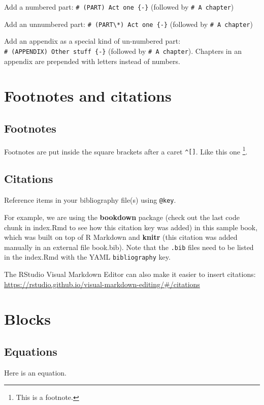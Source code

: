 \documentclass[
  french,
]{book}
\theoremstyle{definition}
\theoremstyle{definition}
\theoremstyle{definition}
\theoremstyle{definition}
\theoremstyle{remark}
\begin{document}
Add a numbered part: \texttt{\#\ (PART)\ Act\ one\ \{-\}} (followed by \texttt{\#\ A\ chapter})

Add an unnumbered part: \texttt{\#\ (PART\textbackslash{}*)\ Act\ one\ \{-\}} (followed by \texttt{\#\ A\ chapter})

Add an appendix as a special kind of un-numbered part: \texttt{\#\ (APPENDIX)\ Other\ stuff\ \{-\}} (followed by \texttt{\#\ A\ chapter}). Chapters in an appendix are prepended with letters instead of numbers.

\chapter{Footnotes and citations}

\section{Footnotes}

Footnotes are put inside the square brackets after a caret \texttt{\^{}{[}{]}}. Like this one \footnote{This is a footnote.}.

\section{Citations}

Reference items in your bibliography file(s) using \texttt{@key}.

For example, we are using the \textbf{bookdown} package \citep{R-bookdown} (check out the last code chunk in index.Rmd to see how this citation key was added) in this sample book, which was built on top of R Markdown and \textbf{knitr} \citep{xie2015} (this citation was added manually in an external file book.bib).
Note that the \texttt{.bib} files need to be listed in the index.Rmd with the YAML \texttt{bibliography} key.

The RStudio Visual Markdown Editor can also make it easier to insert citations: \url{https://rstudio.github.io/visual-markdown-editing/\#/citations}

\chapter{Blocks}

\section{Equations}

Here is an equation.
\end{document}
